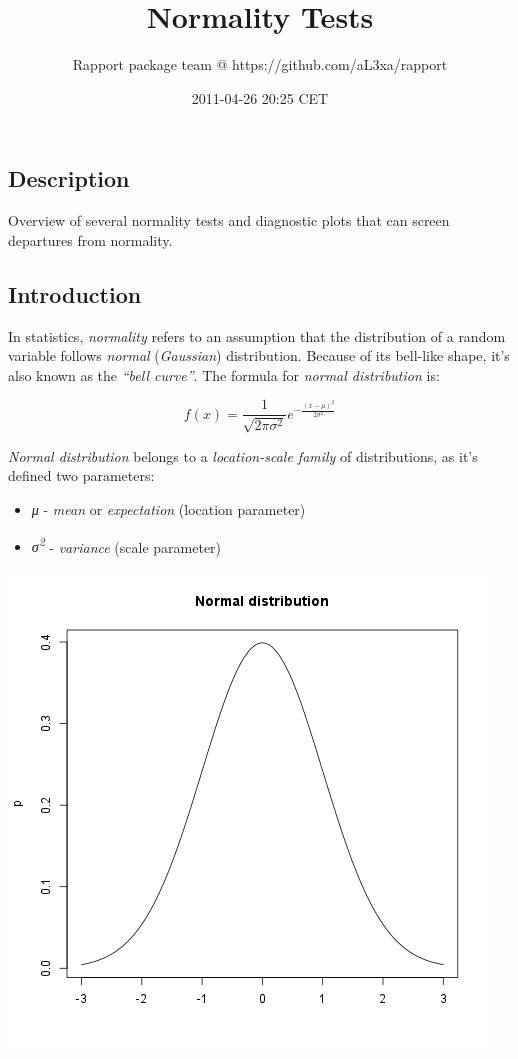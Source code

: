 \documentclass[]{article}
\title{Normality Tests}
\author{Rapport package team @ https://github.com/aL3xa/rapport}
\date{2011-04-26 20:25 CET}
\makeatletter
\def\maxwidth{\ifdim\Gin@nat@width>\linewidth\linewidth
\else\Gin@nat@width\fi}
\let\Oldincludegraphics\includegraphics
\renewcommand{\includegraphics}[1]{\Oldincludegraphics[width=\maxwidth]{#1}}
\makeatother
\begin{document}
\maketitle

\subsection{Description}

Overview of several normality tests and diagnostic plots that can screen
departures from normality.

\subsection{Introduction}

In statistics, \emph{normality} refers to an assumption that the
distribution of a random variable follows \emph{normal}
(\emph{Gaussian}) distribution. Because of its bell-like shape, it's
also known as the \emph{``bell curve''}. The formula for \emph{normal
distribution} is:

\[f(x) = \frac{1}{\sqrt{2\pi{}\sigma{}^2}} e^{-\frac{(x-\mu{})^2}{2\sigma{}^2}}\]

\emph{Normal distribution} belongs to a \emph{location-scale family} of
distributions, as it's defined two parameters:

\begin{itemize}
\item
  \emph{μ} - \emph{mean} or \emph{expectation} (location parameter)
\item
  \emph{σ\textsuperscript{2}} - \emph{variance} (scale parameter)
\end{itemize}
\href{806ea97c59e1a12d4acae4968957aaa9-hires.png}{\includegraphics{806ea97c59e1a12d4acae4968957aaa9.png}}
\end{document}
